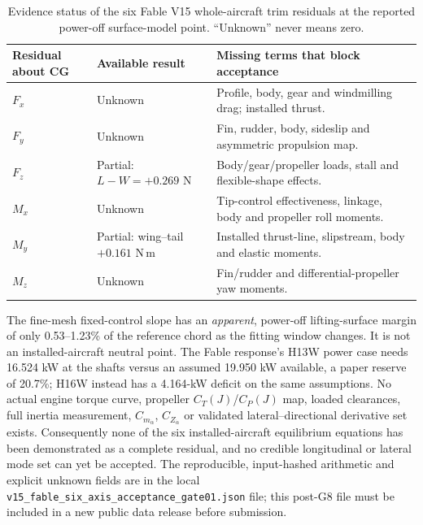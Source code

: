 \begin{table}[p]
\centering\small
\caption{Evidence status of the six Fable V15 whole-aircraft trim residuals at the reported power-off surface-model point. ``Unknown'' never means zero.}
\label{tab:v15-fable-six-axis}
\begin{tabularx}{\linewidth}{@{}p{.16\linewidth}p{.24\linewidth}X@{}}
\toprule
Residual about CG & Available result & Missing terms that block acceptance\\
\midrule
$F_x$ & Unknown & Profile, body, gear and windmilling drag; installed thrust.\\
$F_y$ & Unknown & Fin, rudder, body, sideslip and asymmetric propulsion map.\\
$F_z$ & Partial: $L-W=+0.269$ N & Body/gear/propeller loads, stall and flexible-shape effects.\\
$M_x$ & Unknown & Tip-control effectiveness, linkage, body and propeller roll moments.\\
$M_y$ & Partial: wing--tail $+0.161$ N\,m & Installed thrust-line, slipstream, body and elastic moments.\\
$M_z$ & Unknown & Fin/rudder and differential-propeller yaw moments.\\
\bottomrule
\end{tabularx}
\end{table}

The fine-mesh fixed-control slope has an \emph{apparent}, power-off
lifting-surface margin of only 0.53--1.23\% of the reference chord as the
fitting window changes. It is not an installed-aircraft neutral point.
The Fable response's H13W power case needs 16.524 kW at the shafts versus
an assumed 19.950 kW available, a paper reserve of 20.7\%; H16W instead
has a 4.164-kW deficit on the same assumptions. No actual engine torque
curve, propeller $C_T(J)$/$C_P(J)$ map, loaded clearances, full inertia
measurement, $C_{m_{\dot\alpha}}$, $C_{Z_{\dot\alpha}}$ or validated
lateral--directional derivative set exists. Consequently none of the six
installed-aircraft equilibrium equations has been demonstrated as a
complete residual, and no credible longitudinal or lateral mode set can
yet be accepted. The reproducible, input-hashed arithmetic and explicit
unknown fields are in the local
\texttt{v15\_fable\_six\_axis\_acceptance\_gate01.json} file; this
post-G8 file must be included in a new public data release before submission.
